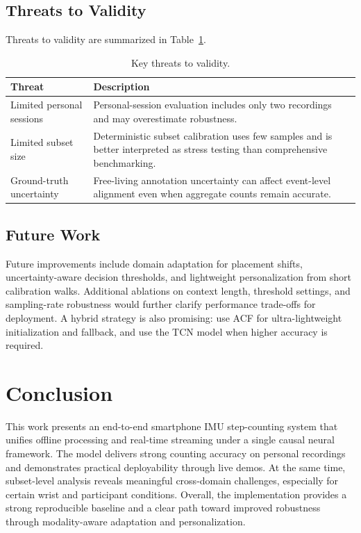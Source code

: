 \subsection{Threats to Validity}
Threats to validity are summarized in Table~\ref{tab:validity_threats}.

\begin{table}[H]
\centering
\caption{Key threats to validity.}
\label{tab:validity_threats}
\small
\begin{tabularx}{\columnwidth}{@{}>{\raggedright\arraybackslash}p{}>{\raggedright\arraybackslash}X@{}}
\toprule
Threat & Description \\
\midrule
Limited personal sessions & Personal-session evaluation includes only two recordings and may overestimate robustness. \\
Limited subset size & Deterministic subset calibration uses few samples and is better interpreted as stress testing than comprehensive benchmarking. \\
Ground-truth uncertainty & Free-living annotation uncertainty can affect event-level alignment even when aggregate counts remain accurate. \\
\bottomrule
\end{tabularx}
\end{table}

\subsection{Future Work}
Future improvements include domain adaptation for placement shifts, uncertainty-aware decision thresholds, and lightweight personalization from short calibration walks. Additional ablations on context length, threshold settings, and sampling-rate robustness would further clarify performance trade-offs for deployment. A hybrid strategy is also promising: use ACF for ultra-lightweight initialization and fallback, and use the TCN model when higher accuracy is required.

\section{Conclusion}
This work presents an end-to-end smartphone IMU step-counting system that unifies offline processing and real-time streaming under a single causal neural framework. The model delivers strong counting accuracy on personal recordings and demonstrates practical deployability through live demos. At the same time, subset-level analysis reveals meaningful cross-domain challenges, especially for certain wrist and participant conditions. Overall, the implementation provides a strong reproducible baseline and a clear path toward improved robustness through modality-aware adaptation and personalization.




